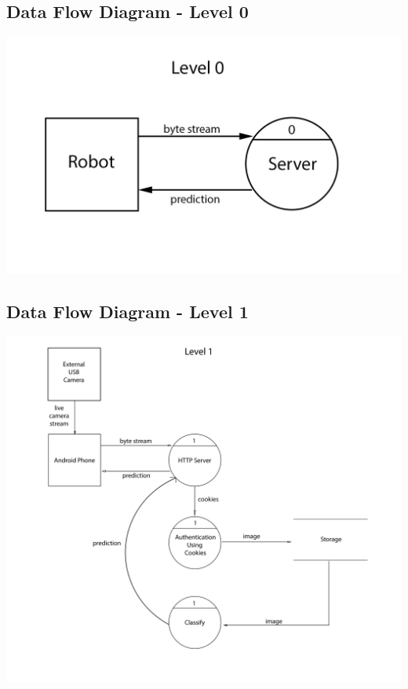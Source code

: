 \documentclass{fisatproject}
\begin{document}
\subsection{Data Flow Diagram - Level 0}
\begin{flushleft}
\centerline{\includegraphics[scale=1.2]{level_0_dia.jpg}}
\end{flushleft}
\subsection{Data Flow Diagram - Level 1}
\includegraphics[scale=0.40]{level_1_dia.jpg}
\newpage
\end{document}
